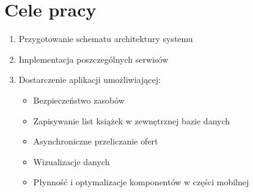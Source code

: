 
\section{Cele pracy}
\label{sec:celePracy}
\begin{enumerate}
    \item Przygotowanie schematu architektury systemu
    \item Implementacja poszczególnych serwisów
    \item Dostarczenie aplikacji umożliwiającej: 
    \begin{itemize}
        \item Bezpieczeństwo zasobów
        \item Zapisywanie list książek w zewnętrznej bazie danych 
        \item Asynchroniczne przeliczanie ofert
        \item Wizualizacje danych
        \item Płynność i optymalizacje komponentów w części mobilnej
    \end{itemize}
\end{enumerate}


